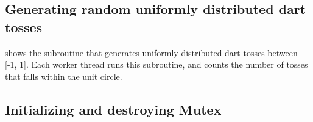 
\subsection{Generating random uniformly distributed dart tosses}

 shows the subroutine that generates uniformly distributed dart tosses between [-1, 1].
Each worker thread runs this subroutine, and counts the number of tosses that falls within the unit circle.

\vspace{0.5cm}



\subsection{Initializing and destroying Mutex}

\vspace{0.5cm}


\vspace{0.5cm}


